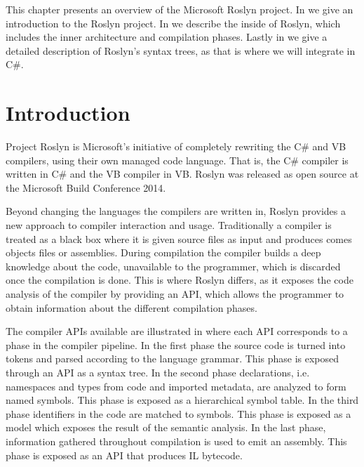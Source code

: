 \makeatletter {}\makeatother
{}
This chapter presents an overview of the Microsoft Roslyn project. In  we give an introduction to the Roslyn project. In  we describe the inside of Roslyn, which includes the inner architecture and compilation phases. Lastly in  we give a detailed description of Roslyn's syntax trees, as that is where we will integrate \stmnamesp in C\#.

\section{Introduction}\label{sec:intro}
Project Roslyn is Microsoft's initiative of completely rewriting the C\# and \ac{VB} compilers, using their own managed code language. That is, the C\# compiler is written in C\# and the \ac{VB} compiler in \ac{VB}. Roslyn was released as open source at the Microsoft Build Conference 2014\cite{csharpBuild}.

Beyond changing the languages the compilers are written in, Roslyn provides a new approach to compiler interaction and usage. Traditionally a compiler is treated as a black box where it is given source files as input and produces comes objects files or assemblies\cite[p. 3]{ng2012roslyn}. During compilation the compiler builds a deep knowledge about the code, unavailable to the programmer, which is discarded once the compilation is done. This is where Roslyn differs, as it exposes the code analysis of the compiler by providing an \ac{API}, which allows the programmer to obtain information about the different compilation phases\cite[p. 3]{ng2012roslyn}. 

The compiler \acp{API} available are illustrated in  where each \ac{API} corresponds to a phase in the compiler pipeline. In the first phase the source code is turned into tokens and parsed according to the language grammar. This phase is exposed through an \ac{API} as a syntax tree. In the second phase declarations, i.e. namespaces and types from code and imported metadata, are analyzed to form named symbols. This phase is exposed as a hierarchical symbol table. In the third phase identifiers in the code are matched to symbols. This phase is exposed as a model which exposes the result of the semantic analysis. In the last phase, information gathered throughout compilation is used to emit an assembly. This phase is exposed as an \ac{API} that produces IL bytecode\cite[p. 3-4]{ng2012roslyn}.

